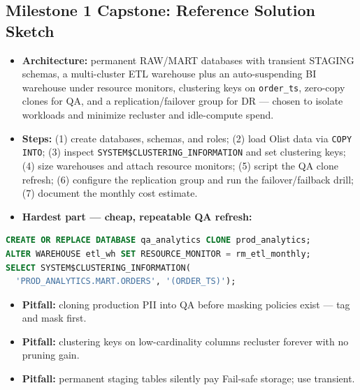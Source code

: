 \documentclass[11pt, a4paper]{article}
\begin{document}
\subsection*{Milestone 1 Capstone: Reference Solution Sketch}
\begin{itemize}[label=-, nosep]
    \item \textbf{Architecture:} permanent RAW/MART databases with transient STAGING schemas, a multi-cluster ETL warehouse plus an auto-suspending BI warehouse under resource monitors, clustering keys on \texttt{order\_ts}, zero-copy clones for QA, and a replication/failover group for DR --- chosen to isolate workloads and minimize recluster and idle-compute spend.
    \item \textbf{Steps:} (1) create databases, schemas, and roles; (2) load Olist data via \texttt{COPY INTO}; (3) inspect \texttt{SYSTEM\$CLUSTERING\_INFORMATION} and set clustering keys; (4) size warehouses and attach resource monitors; (5) script the QA clone refresh; (6) configure the replication group and run the failover/failback drill; (7) document the monthly cost estimate.
    \item \textbf{Hardest part --- cheap, repeatable QA refresh:}
\end{itemize}
\begin{lstlisting}[language=SQL, caption={Zero-copy QA refresh + clustering check}]
CREATE OR REPLACE DATABASE qa_analytics CLONE prod_analytics;
ALTER WAREHOUSE etl_wh SET RESOURCE_MONITOR = rm_etl_monthly;
SELECT SYSTEM$CLUSTERING_INFORMATION(
  'PROD_ANALYTICS.MART.ORDERS', '(ORDER_TS)');
\end{lstlisting}
\begin{itemize}[label=-, nosep]
    \item \textbf{Pitfall:} cloning production PII into QA before masking policies exist --- tag and mask first.
    \item \textbf{Pitfall:} clustering keys on low-cardinality columns recluster forever with no pruning gain.
    \item \textbf{Pitfall:} permanent staging tables silently pay Fail-safe storage; use transient.
\end{itemize}
\end{document}
